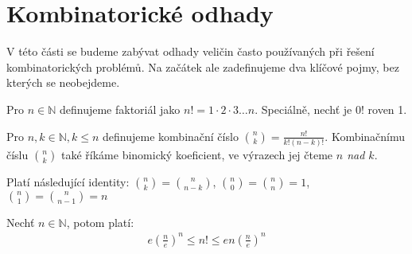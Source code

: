 \section{Kombinatorické odhady}
V této části se budeme zabývat odhady veličin často používaných při řešení kombinatorických problémů. Na začátek ale zadefinujeme dva klíčové pojmy, bez kterých se neobejdeme.

\begin{t_definition}
  Pro $n\in\mathbb{N}$ definujeme faktoriál jako $n!=1\cdot 2\cdot 3\dots n$. Speciálně, nechť je $0!$ roven 1.
\end{t_definition}

\begin{t_definition}
  Pro $n,k\in\mathbb{N}, k\leq n$ definujeme kombinační číslo $\binom{n}{k}=\frac{n!}{k!(n-k)!}$. Kombinačnímu číslu $\binom{n}{k}$ také říkáme binomický koeficient, ve výrazech jej čteme \textit{$n$ nad $k$}.
\end{t_definition}

\begin{t_observation}
  Platí následující identity: $\binom{n}{k}=\binom{n}{n-k}$, $\binom{n}{0}=\binom{n}{n}=1$, $\binom{n}{1}=\binom{n}{n-1}=n$
\end{t_observation}

\begin{t_theorem}
  Nechť $n\in\mathbb{N}$, potom platí:
  \begin{align*}
    e\left(\frac{n}{e}\right)^n\leq n! \leq en\left(\frac{n}{e}\right)^n
  \end{align*}
\end{t_theorem}

